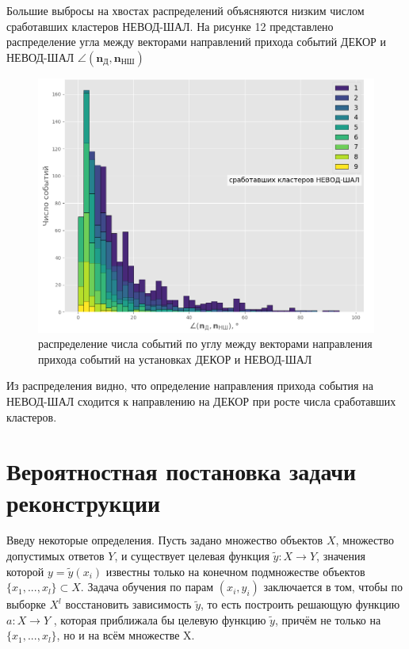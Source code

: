Большие выбросы на хвостах распределений объясняются низким числом сработавших кластеров НЕВОД-ШАЛ. На рисунке 12 представлено распределение угла между векторами направлений прихода событий ДЕКОР и НЕВОД-ШАЛ \(\angle(\mathbf{n_{\text{Д}}}, \mathbf{n_{\text{НШ}}})\)

\begin{figure}[ht]
    \centering
    \includegraphics[width=1\textwidth]{images/vecs_angel.png}
    \caption{распределение числа событий по углу между векторами направления прихода событий на установках ДЕКОР и НЕВОД-ШАЛ}
    \label{fig:vecs_angel}
\end{figure}


Из распределения видно, что определение направления прихода события на НЕВОД-ШАЛ сходится к направлению на ДЕКОР при росте числа сработавших кластеров.

\section*{Вероятностная постановка задачи реконструкции}
\label{sec:methods}
Введу некоторые определения.
Пусть задано множество объектов \(X\), множество допустимых ответов \(Y\), и существует целевая функция \(\tilde{y} : X \to Y\), значения которой \(y = \tilde{y}(x_i)\) известны только на конечном подмножестве объектов \(\{x_1,...,x_l\} \subset X\). Задача обучения по парам \((x_i, y_i)\) заключается в том, чтобы по выборке \(X^l\) восстановить зависимость \(\tilde{y}\), то есть построить решающую функцию \(a : X \to Y\) , которая приближала бы целевую функцию \(\tilde{y}\), причём не только на  \(\{x_1,...,x_l\}\), но и на всём множестве X.

